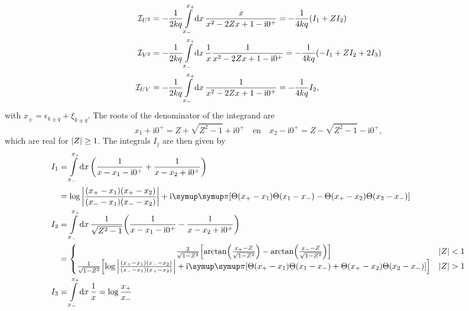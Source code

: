 \documentclass[10pt,a4paper]{article}
\let\canpi\pi
\renewcommand\pi{\symup\canpi}%
\newcommand{\ii}{\ensuremath{\mathrm{i}}}
\begin{document}
\begin{align}
    \mathcal{I}_{U^2} &
    = -\frac{1}{2kq} \int\limits_{x_-}^{x_+} \dd{x} \frac{x}{x^2-2Zx+1-\ii 0^+} 
    = -\frac{1}{4kq} \qty(I_1 + Z I_2)\\
    \mathcal{I}_{V^2} &
    = -\frac{1}{2kq} \int\limits_{x_-}^{x_+} \dd{x} \frac{1}{x} \frac{1}{x^2-2Zx+1-\ii 0^+} 
    = -\frac{1}{4kq} \qty(-I_1 + Z I_2 + 2 I_3)\\
    \mathcal{I}_{UV} &
    = -\frac{1}{2kq} \int\limits_{x_-}^{x_+} \dd{x} \frac{1}{x^2-2Zx+1-\ii 0^+}
    = -\frac{1}{4kq} I_2,
\end{align}
with $x_\pm = \epsilon_{k\pm q}+\xi_{k\pm q}$. The roots of the denominator of the integrand are
\begin{equation}
    x_1 + \ii 0^+ = Z + \sqrt{Z^2-1} + \ii 0^+ \quad \text{en} \quad 
    x_2 - \ii 0^+ = Z - \sqrt{Z^2-1} - \ii 0^+, 
\end{equation}
which are real for $\abs{Z}\geq 1$. The integrals $I_j$ are then given by
\begin{align}
    I_1 &= \int\limits_{x_-}^{x_+} \dd{x} \qty(
        \frac{1}{x-x_1-\ii 0^+} + \frac{1}{x-x_2+\ii 0^+}
    ) \\ &= \log \abs{
        \frac{(x_+-x_1)(x_+-x_2)}{(x_--x_1)(x_--x_2)}
    } +\ii \pi \qty[
        \Theta(x_+-x_1)\Theta(x_1-x_-)-\Theta(x_+-x_2)\Theta(x_2-x_-)
    ] \\
    I_2 &= \int\limits_{x_-}^{x_+} \dd{x} \frac{1}{\sqrt{Z^2-1}} \qty(
        \frac{1}{x-x_1-\ii 0^+} - \frac{1}{x-x_2+\ii 0^+}
    ) \\ &= \left\lbrace \mqty{
        \frac{2}{\sqrt{1-Z^2}} \qty[
            \arctan(\frac{x_+-Z}{\sqrt{1-Z^2}}) - \arctan(\frac{x_- -Z}{\sqrt{1-Z^2}})
        ] & \abs{Z} < 1 \\
        \frac{1}{\sqrt{1-Z^2}} \qty[
            \log \abs{
                \frac{(x_+-x_1)(x_--x_2)}{(x_--x_1)(x_+-x_2)}
            } +\ii \pi \qty[
                \Theta(x_+-x_1)\Theta(x_1-x_-)+\Theta(x_+-x_2)\Theta(x_2-x_-)
            ]
        ] & \abs{Z} > 1
    } \right. \\
    I_3 &= \int\limits_{x_-}^{x_+} \dd{x} \frac{1}{x} 
    = \log \frac{x_+}{x_-}
\end{align}
\end{document}
